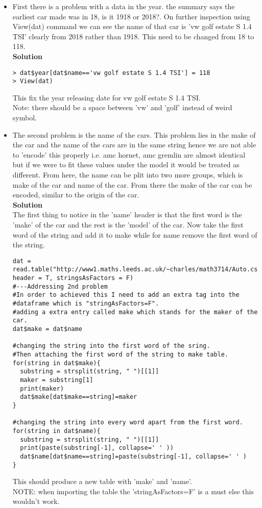 \documentclass[11pt]{article} %
\begin{document}
\begin{itemize}
\item First there is a problem with a data in the year. the summary says the earliest car made was in 18, is it 1918 or 2018?. On further inspection using View(dat) command we can see the name of that car is 'vw golf estate S 1.4 TSI' clearly from 2018 rather than 1918. This need to be changed from 18 to 118. \\
\textbf{Solution}
\begin{lstlisting}
> dat$year[dat$name=='vw golf estate S 1.4 TSI'] = 118
> View(dat)
\end{lstlisting}
This fix the year releasing date for vw golf estate S 1.4 TSI.\\
Note: there should be a space between 'vw' and 'golf' instead of weird symbol.
\item The second problem is the name of the cars. This problem lies in the make of the car and the name of the cars are in the same string hence we are not able to 'encode' this properly i.e. amc hornet, amc gremlin are almost identical but if we were to fit these values under the model it would be treated as different. From here, the name can be plit into two more groups, which is make of the car and name of the car. From there the make of the car can be encoded, similar to the origin of the car.\\
\textbf{Solution}\\
The first thing to notice in the 'name' header is that the first word is the 'make' of the car and the rest is the 'model' of the car. Now take the first word of the string and add it to make while for name remove the first word of the string.
\begin{lstlisting}
dat = read.table("http://www1.maths.leeds.ac.uk/~charles/math3714/Auto.csv", header = T, stringsAsFactors = F)
#---Addressing 2nd problem
#In order to achieved this I need to add an extra tag into the 
#dataframe which is "stringAsFactors=F".
#adding a extra entry called make which stands for the maker of the car.
dat$make = dat$name

#changing the string into the first word of the sring.
#Then attaching the first word of the string to make table.
for(string in dat$make){
  substring = strsplit(string, " ")[[1]]
  maker = substring[1]
  print(maker)
  dat$make[dat$make==string]=maker
}

#changing the string into every word apart from the first word.
for(string in dat$name){
  substring = strsplit(string, " ")[[1]]
  print(paste(substring[-1], collapse=' ' ))
  dat$name[dat$name==string]=paste(substring[-1], collapse=' ' )
}
\end{lstlisting}
This should produce a new table with 'make' and 'name'.\\
NOTE: when importing the table the 'stringAsFactors=F' is a must else this wouldn't work.


\end{itemize}
\end{document}
